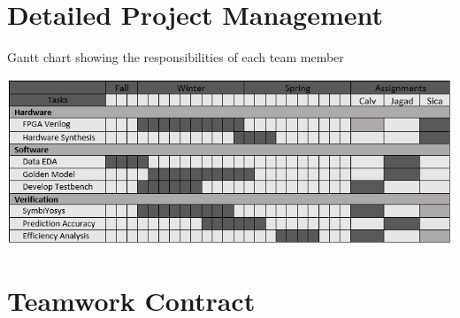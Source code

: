 \documentclass[12pt,titlepage]{article}
\begin{document}



\begin{appendices}
\section{Detailed Project Management}
\begin{table}[!htb]
	\caption{Gantt chart showing the responsibilities of each team member}
	\label{tbl:gantt}
	\includegraphics[width=\linewidth]{gantt.png}
\end{table}
\section{Teamwork Contract}
\end{appendices}
\end{document}
